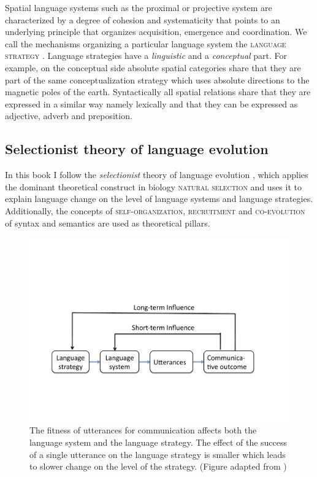 Spatial language systems such as the proximal or projective system 
are characterized by a degree of cohesion and systematicity 
that points to an underlying principle that organizes acquisition, emergence 
and coordination. We call the mechanisms organizing a particular language
system the \textsc{language strategy} \citep{steels2011self-organization}.
Language strategies have a \emph{linguistic} and a \emph{conceptual} 
part. For example, on the conceptual 
side absolute spatial categories share that they
are part of the same conceptualization strategy which uses absolute directions
to the magnetic poles of the earth. Syntactically all spatial relations share
that they are expressed in a similar way namely lexically and that they can
be expressed as adjective, adverb and preposition. 


\subsection{Selectionist theory of language evolution}
In this book I follow the \emph{selectionist} theory of language evolution
\citep{steels2011self-organization}, which applies the dominant theoretical construct 
in biology \textsc{natural selection} and uses it to explain language change
on the level of language systems and language strategies.
Additionally, the concepts of \textsc{self-organization},
\textsc{recruitment} and \textsc{co-evolution} of syntax and semantics are
used as theoretical pillars.

\begin{figure}
\begin{center}
\includegraphics[width=0.7\columnwidth]{figs/select-strat}
\end{center}
\caption[Selective pressures on language systems and strategies]{The fitness of utterances for communication affects both the language
system and the language strategy. The effect of the success of a single utterance 
on the language strategy is smaller which leads to slower change on the level 
of the strategy. (Figure adapted from \citealt{steels2011self-organization})}
\label{f:strategy-system-selection}
\end{figure}

